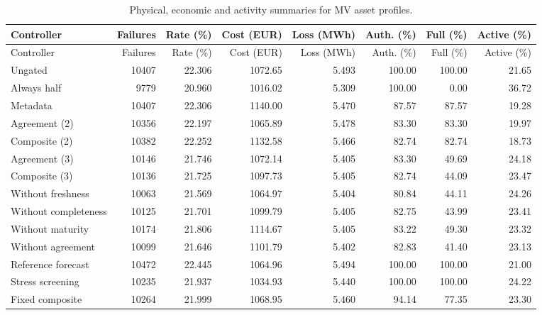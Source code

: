 \documentclass[11pt]{article}
\begin{document}
\small\begin{longtable}{lrrrrrrr}
\caption{Physical, economic and activity summaries for MV asset profiles.}\\\toprule
Controller & Failures & Rate (\%) & Cost (EUR) & Loss (MWh) & Auth. (\%) & Full (\%) & Active (\%)\\\midrule
\endfirsthead
\toprule
Controller & Failures & Rate (\%) & Cost (EUR) & Loss (MWh) & Auth. (\%) & Full (\%) & Active (\%)\\\midrule
\endhead
\bottomrule\endfoot
Ungated & 10407 & 22.306 & 1072.65 & 5.493 & 100.00 & 100.00 & 21.65\\
Always half & 9779 & 20.960 & 1016.02 & 5.309 & 100.00 & 0.00 & 36.72\\
Metadata & 10407 & 22.306 & 1140.00 & 5.470 & 87.57 & 87.57 & 19.28\\
Agreement (2) & 10356 & 22.197 & 1065.89 & 5.478 & 83.30 & 83.30 & 19.97\\
Composite (2) & 10382 & 22.252 & 1132.58 & 5.466 & 82.74 & 82.74 & 18.73\\
Agreement (3) & 10146 & 21.746 & 1072.14 & 5.405 & 83.30 & 49.69 & 24.18\\
Composite (3) & 10136 & 21.725 & 1097.73 & 5.405 & 82.74 & 44.09 & 23.47\\
Without freshness & 10063 & 21.569 & 1064.97 & 5.404 & 80.84 & 44.11 & 24.26\\
Without completeness & 10125 & 21.701 & 1099.79 & 5.405 & 82.75 & 43.99 & 23.41\\
Without maturity & 10174 & 21.806 & 1114.67 & 5.405 & 83.22 & 49.30 & 23.32\\
Without agreement & 10099 & 21.646 & 1101.79 & 5.402 & 82.83 & 41.40 & 23.13\\
Reference forecast & 10472 & 22.445 & 1064.96 & 5.494 & 100.00 & 100.00 & 21.00\\
Stress screening & 10235 & 21.937 & 1034.93 & 5.440 & 100.00 & 100.00 & 24.22\\
Fixed composite & 10264 & 21.999 & 1068.95 & 5.460 & 94.14 & 77.35 & 23.30\\
\end{longtable}\normalsize
\end{document}
